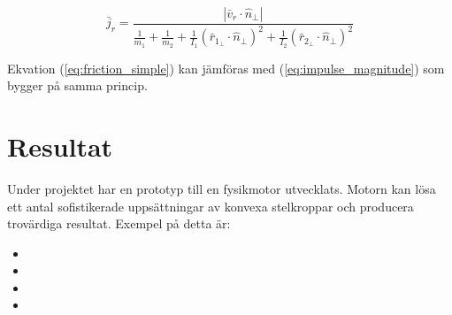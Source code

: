 \documentclass[a4paper,12pt,twopage,swedish]{article}
\begin{document}
\begin{equation}\label{eq:friction_simple}
\bar{j}_r = \frac{|\bar{v}_r \cdot \hat{n}_{\perp}|}{\frac{1}{m_1}+\frac{1}{m_2}+\frac{1}{I_1}(\bar{r}_{1_{\perp}} \cdot \hat{n}_{\perp})^2+\frac{1}{I_2}(\bar{r}_{2_{\perp}} \cdot \hat{n}_{\perp})^2}
\end{equation}

Ekvation (\ref{eq:friction_simple}) kan jämföras med (\ref{eq:impulse_magnitude}) som bygger på samma princip.





\section{Resultat}
Under projektet har en prototyp till en fysikmotor utvecklats. Motorn kan lösa ett antal sofistikerade uppsättningar av konvexa stelkroppar och producera trovärdiga resultat. 
Exempel på detta är:

\begin{itemize}
\item {}
\item {}
\item {}
\item {}
\end{itemize}
\end{document}
